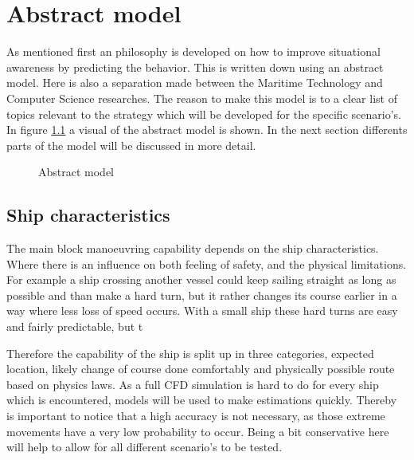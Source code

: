\chapter{Abstract model}
As mentioned first an philosophy is developed on how to improve situational awareness by predicting the behavior. This is written down using an abstract model. Here is also a separation made between the Maritime Technology and Computer Science researches. 
The reason to make this model is to a clear list of topics relevant to the strategy which will be developed for the specific scenario's.
In figure \ref{fig:abstract-model} a visual of the abstract model is shown. In the next section differents parts of the model will be discussed in more detail.

\begin{figure}[hb]
	\centering
	\caption{Abstract model}
	\label{fig:abstract-model}
\end{figure}

\section{Ship characteristics}
The main block manoeuvring capability depends on the ship characteristics. Where there is an influence on both feeling of safety, and the physical limitations. For example a ship crossing another vessel could keep sailing straight as long as possible and than make a hard turn, but it rather changes its course earlier in a way where less loss of speed occurs. With a small ship these hard turns are easy and fairly predictable, but t

Therefore the capability of the ship is split up in three categories, expected location, likely change of course done comfortably and physically possible route based on physics laws.
As a full CFD simulation is hard to do for every ship which is encountered, models will be used to make estimations quickly. Thereby is important to notice that a high accuracy is not necessary, as those extreme movements have a very low probability to occur. Being a bit conservative here will help to allow for all different scenario's to be tested.

